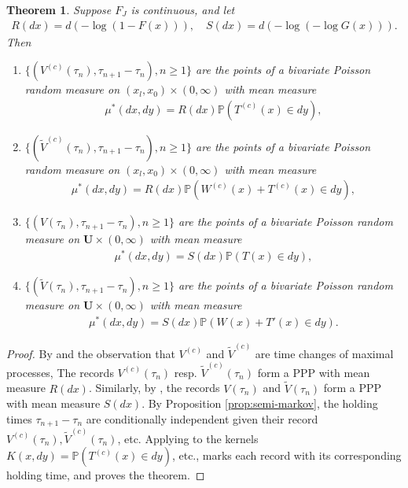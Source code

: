 \documentclass[12pt, a4paper]{article}
\newtheorem{theorem}[equation]{Theorem}
\newcommand{\PP}{\mathbb{P}}
\newcommand{\1}{\mathbf 1}
\begin{document}
\begin{theorem}
Suppose $F_J$ is continuous, and let 
\begin{align}
  R(dx) = d(-\log(1-F(x))), \quad S(dx) = d(-\log(-\log G(x))).
\end{align} 
Then 
\begin{enumerate}
  \item 
  $\{(V^{(c)}(\tau_n), \tau_{n+1} - \tau_n), n \ge 1\}$ 
  are the points of a bivariate Poisson random measure on
  $(x_l, x_0) \times (0,\infty)$ with mean measure
  \begin{align}
  \mu^*(dx, dy) = R(dx) \PP(T^{(c)}(x) \in dy),
  \end{align}
  \item
  $\{(\tilde V^{(c)}(\tau_n), \tau_{n+1} - \tau_n), n \ge 1\}$ 
  are the points of a bivariate Poisson random measure on
  $(x_l, x_0) \times (0,\infty)$ with mean measure
  \begin{align}
  \mu^*(dx, dy) = R(dx) \PP(W^{(c)}(x) + T^{(c)}(x) \in dy),
  \end{align}
  \item
  $\{(V(\tau_n), \tau_{n+1} - \tau_n), n \ge 1\}$ 
  are the points of a bivariate Poisson random measure on
  $\mathbf U \times (0,\infty)$ with mean measure
  \begin{align}
  \mu^*(dx, dy) = S(dx) \PP(T(x) \in dy),
  \end{align}
  \item
  $\{(\tilde V(\tau_n), \tau_{n+1} - \tau_n), n \ge 1\}$ 
  are the points of a bivariate Poisson random measure on
  $\mathbf U \times (0,\infty)$ with mean measure
  \begin{align}
  \mu^*(dx, dy) = S(dx) \PP(W(x) + T'(x) \in dy).
  \end{align}
\end{enumerate}
\end{theorem}

\begin{proof}
By \cite[Prop 4.1(iii)]{resnick2013extreme} and the observation that 
$V^{(c)}$ and $\tilde V^{(c)}$ are time changes of maximal processes, 
The records $V^{(c)}(\tau_n)$ resp. $\tilde V^{(c)}(\tau_n)$ form 
a PPP with mean measure $R(dx)$. 
Similarly, by \cite[Prop 4.8(iii)]{resnick2013extreme}, the records 
$V(\tau_n)$ and $\tilde V(\tau_n)$ form a PPP with mean measure $S(dx)$. 
By Proposition \ref{prop:semi-markov}, the holding times $\tau_{n+1} - \tau_n$
are conditionally independent given their record 
$V^{(c)}(\tau_n), \tilde V^{(c)}(\tau_n)$, etc.
Applying \cite[Prop 3.8]{resnick2013extreme} to the kernels 
$K(x,dy) = \PP(T^{(c)}(x) \in dy)$, etc., marks each record with its corresponding 
holding time, and proves the theorem. 
\end{proof}
\end{document}
